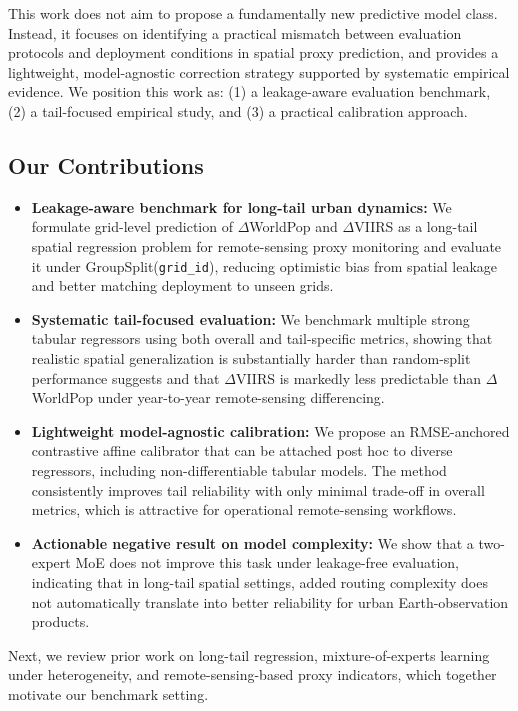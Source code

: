 \documentclass[preprint,12pt]{elsarticle}
\begin{document}
This work does not aim to propose a fundamentally new predictive model class. Instead, it focuses on identifying a practical mismatch between evaluation protocols and deployment conditions in spatial proxy prediction, and provides a lightweight, model-agnostic correction strategy supported by systematic empirical evidence. We position this work as: (1) a leakage-aware evaluation benchmark, (2) a tail-focused empirical study, and (3) a practical calibration approach.

\subsection{Our Contributions}
\begin{itemize}
    \item \textbf{Leakage-aware benchmark for long-tail urban dynamics:} We formulate grid-level prediction of $\Delta$WorldPop and $\Delta$VIIRS as a long-tail spatial regression problem for remote-sensing proxy monitoring and evaluate it under GroupSplit(\texttt{grid\_id}), reducing optimistic bias from spatial leakage and better matching deployment to unseen grids.

    \item \textbf{Systematic tail-focused evaluation:} We benchmark multiple strong tabular regressors using both overall and tail-specific metrics, showing that realistic spatial generalization is substantially harder than random-split performance suggests and that $\Delta$VIIRS is markedly less predictable than $\Delta$WorldPop under year-to-year remote-sensing differencing.

    \item \textbf{Lightweight model-agnostic calibration:} We propose an RMSE-anchored contrastive affine calibrator that can be attached post hoc to diverse regressors, including non-differentiable tabular models. The method consistently improves tail reliability with only minimal trade-off in overall metrics, which is attractive for operational remote-sensing workflows.

    \item \textbf{Actionable negative result on model complexity:} We show that a two-expert MoE does not improve this task under leakage-free evaluation, indicating that in long-tail spatial settings, added routing complexity does not automatically translate into better reliability for urban Earth-observation products.
\end{itemize}

Next, we review prior work on long-tail regression, mixture-of-experts learning under heterogeneity, and remote-sensing-based proxy indicators, which together motivate our benchmark setting.
\end{document}
